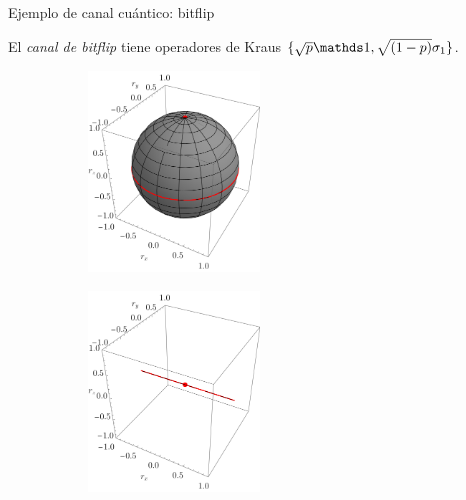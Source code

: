 \begin{frame}{Ejemplo de canal cuántico: bitflip}
    \begin{center}
        El \textit{canal de bitflip} tiene operadores de Kraus $\{\sqrt{p}\Id,\sqrt{(1-p)}\pauli{1}\}$.
    \end{center}
    \begin{figure}
        \centering
        \begin{subfigure}{0.45\textwidth}
            \centering
            \includegraphics[width=0.5\textwidth]{figures/whole_sphere.png}
        \end{subfigure}
        \begin{subfigure}{0.45\textwidth}
            \centering
            \includegraphics[width=0.5\textwidth]{figures/bitflip.png}
        \end{subfigure}
    \end{figure}
\end{frame}
